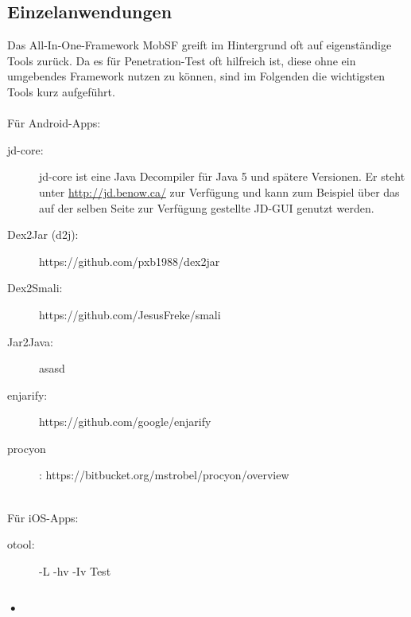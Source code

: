 \subsection{Einzelanwendungen}\label{Pen:Eingelanwendungen}
Das All-In-One-Framework MobSF greift im Hintergrund oft auf eigenständige Tools zurück. Da es für Penetration-Test oft hilfreich ist, diese ohne ein umgebendes Framework nutzen zu können, sind im Folgenden die wichtigsten Tools kurz aufgeführt.
\\\\
Für Android-Apps:
\begin{description}
	\item[jd-core: ]jd-core ist eine Java Decompiler für Java 5 und spätere Versionen. Er steht unter \url{http://jd.benow.ca/} zur Verfügung und kann zum Beispiel über das auf der selben Seite zur Verfügung gestellte JD-GUI genutzt werden.
	\item[Dex2Jar (d2j): ] https://github.com/pxb1988/dex2jar
	\item[Dex2Smali: ] https://github.com/JesusFreke/smali
	\item[Jar2Java: ]asasd
	\item[enjarify: ] https://github.com/google/enjarify
	\item[procyon]: https://bitbucket.org/mstrobel/procyon/overview
\end{description}
$ $\\\\
Für iOS-Apps:
\begin{description}
	\item[otool: ] -L -hv -Iv
		\subitem[-L] Test
\end{description}

\subsubsection{•}
